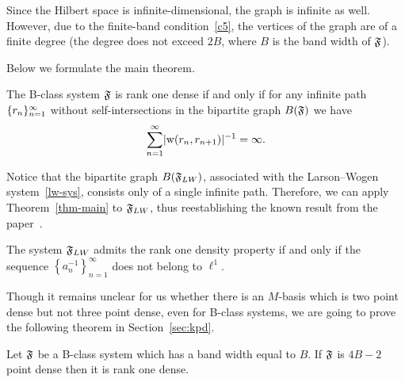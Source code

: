 \documentclass[12pt,oneside,a4paper]{amsart}
\begin{document}
    Since the Hilbert space is infinite-dimensional, the graph is infinite as well.
    However, due to the finite-band condition~\ref{c5}, the vertices of the graph are of a finite degree (the degree does not
      exceed $2B$, where $B$ is the band width of $\mathfrak{F}$).

    \medskip
    Below we formulate the main theorem.
    \begin{theorem}
      \label{thm-main}
      The B-class system $\mathfrak{F}$ is rank one dense if and only if
        for any infinite path $\{{r}_n\}_{n=1}^\infty$ without self-intersections in the bipartite graph $B(\mathfrak{F})$
        we have
        \[
          \sum_{n=1}^\infty\lvert\mathrm{w}(r_n, r_{n+1})\rvert^{-1} = \infty.
        \]
    \end{theorem}
    Notice that the bipartite graph $B(\mathfrak{F}_{LW})$, associated with the Larson--Wogen system~\eqref{lw-sys},
      consists only of a single infinite path.
    Therefore, we can apply Theorem~\ref{thm-main} to $\mathfrak{F}_{LW}$, thus reestablishing
      the known result from the paper~\cite{katavolos}.
    \begin{corol}
      The system $\mathfrak{F}_{LW}$ admits the rank one density property if and only if
        the sequence $\left\{a_n^{-1}\right\}_{n=1}^\infty$ does not belong to $\ell^1$.
    \end{corol}

    Though it remains unclear for us whether there is an $M$-basis which is two point dense but not three point dense,
      even for B-class systems, we are going to prove the following theorem in Section~\ref{sec:kpd}.
    \begin{theorem}
      \label{thm-kpd}
      Let $\mathfrak{F}$ be a B-class system which has a band width equal to $B$.
      If $\mathfrak{F}$ is $4B - 2$ point dense then it is rank one dense.
    \end{theorem}
\end{document}
